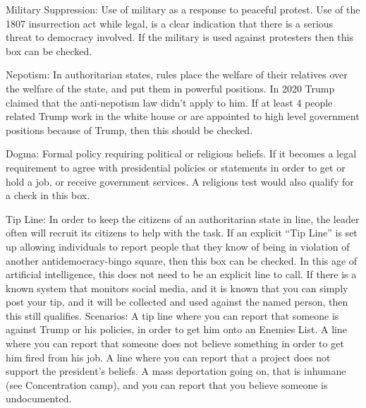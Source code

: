 \documentclass{article}
\begin{document}
Military Suppression: Use of military as a response to peaceful protest.  Use of the 1807
insurrection act while legal, is a clear indication that there is a serious threat to
democracy involved.  If the military is used against protesters then this box can be checked.


Nepotism: In authoritarian states, rules place the welfare of their relatives over the
welfare of the state, and put them in powerful positions.  In 2020 Trump claimed that the
anti-nepotism law didn't apply to him.  If at least 4 people related Trump work in the white
house or are appointed to high level government positions because of Trump, then this
should be checked. 

Dogma: Formal policy requiring political or religious beliefs.  If it becomes a legal requirement
to agree with presidential policies or statements in order to get or hold a job, or receive
government services.  A religious test would also qualify for a check in this box.

Tip Line:
In order to keep the citizens of an authoritarian state in line, the leader often will
recruit its citizens to help with the task.  If an explicit ``Tip Line'' is set up allowing
individuals to report people that they know of being in violation of another
antidemocracy-bingo square, then this box can be checked.  In this age of artificial
intelligence, this does not need to be an explicit line to call.  If there is a known
system that monitors social media, and it is known that you can simply post your tip,
and it will be collected and used against the named person, then this still qualifies.
Scenarios:
A tip line where you can report that someone is against Trump or his policies,
in order to get him onto an Enemies List.
A line where you can report that someone does not believe something in order to get
him fired from his job.
A line where you can report that a project does not support the president's beliefs.
A mass deportation going on, that is inhumane (see Concentration camp), and
you can report that you believe someone is undocumented.
\end{document}

